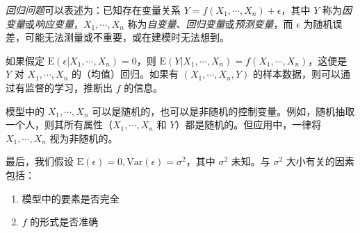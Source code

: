 \documentclass[../main.tex]{subfiles}
\begin{document}
\emph{回归问题}可以表述为：已知存在变量关系 $Y=f(X_1,\cdots,X_n)+\epsilon$，其中 $Y$ 称为\emph{因变量}或\emph{响应变量}，$X_1,\cdots,X_n$ 称为\emph{自变量}、\emph{回归变量}或\emph{预测变量}，而 $\epsilon$ 为随机误差，可能无法测量或不重要，或在建模时无法想到。

如果假定 $\mathrm E(\epsilon|X_1,\cdots,X_n)=0$，则 $\mathrm E(Y|X_1,\cdots,X_n)=f(X_1,\cdots,X_n)$，这便是 $Y$ 对 $X_1,\cdots,X_n$ 的（均值）回归。如果有 $(X_1,\cdots,X_n,Y)$ 的样本数据，则可以通过有监督的学习，推断出 $f$ 的信息。

模型中的 $X_1,\cdots,X_n$ 可以是随机的，也可以是非随机的控制变量。例如，随机抽取一个人，则其所有属性（$X_1,\cdots,X_n$ 和 $Y$）都是随机的。但应用中，一律将 $X_1,\cdots,X_n$ 视为非随机的。

最后，我们假设 $\mathrm E(\epsilon)=0,\mathrm{Var}(\epsilon)=\sigma^2$，其中 $\sigma^2$ 未知。与 $\sigma^2$ 大小有关的因素包括：
\begin{enumerate}
    \item 模型中的要素是否完全
    \item $f$ 的形式是否准确
\end{enumerate}
\end{document}
